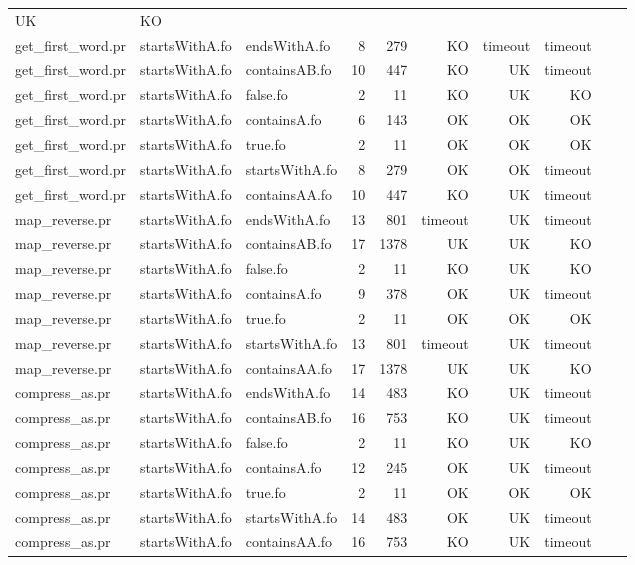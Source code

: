 \begin{tabular}{l|l|l|r|r|r|r|r|r|r}
UK & KO \\
get\_first\_word.pr & startsWithA.fo & endsWithA.fo & 8 & 279 & KO & 
timeout & timeout \\
get\_first\_word.pr & startsWithA.fo & containsAB.fo & 10 & 447 & KO & 
UK & timeout \\
get\_first\_word.pr & startsWithA.fo & false.fo & 2 & 11 & KO & 
UK & KO \\
get\_first\_word.pr & startsWithA.fo & containsA.fo & 6 & 143 & OK & 
OK & OK \\
get\_first\_word.pr & startsWithA.fo & true.fo & 2 & 11 & OK & 
OK & OK \\
get\_first\_word.pr & startsWithA.fo & startsWithA.fo & 8 & 279 & OK & 
OK & timeout \\
get\_first\_word.pr & startsWithA.fo & containsAA.fo & 10 & 447 & KO & 
UK & timeout \\
map\_reverse.pr & startsWithA.fo & endsWithA.fo & 13 & 801 & timeout & 
UK & timeout \\
map\_reverse.pr & startsWithA.fo & containsAB.fo & 17 & 1378 & UK & 
UK & KO \\
map\_reverse.pr & startsWithA.fo & false.fo & 2 & 11 & KO & 
UK & KO \\
map\_reverse.pr & startsWithA.fo & containsA.fo & 9 & 378 & OK & 
UK & timeout \\
map\_reverse.pr & startsWithA.fo & true.fo & 2 & 11 & OK & 
OK & OK \\
map\_reverse.pr & startsWithA.fo & startsWithA.fo & 13 & 801 & timeout & 
UK & timeout \\
map\_reverse.pr & startsWithA.fo & containsAA.fo & 17 & 1378 & UK & 
UK & KO \\
compress\_as.pr & startsWithA.fo & endsWithA.fo & 14 & 483 & KO & 
UK & timeout \\
compress\_as.pr & startsWithA.fo & containsAB.fo & 16 & 753 & KO & 
UK & timeout \\
compress\_as.pr & startsWithA.fo & false.fo & 2 & 11 & KO & 
UK & KO \\
compress\_as.pr & startsWithA.fo & containsA.fo & 12 & 245 & OK & 
UK & timeout \\
compress\_as.pr & startsWithA.fo & true.fo & 2 & 11 & OK & 
OK & OK \\
compress\_as.pr & startsWithA.fo & startsWithA.fo & 14 & 483 & OK & 
UK & timeout \\
compress\_as.pr & startsWithA.fo & containsAA.fo & 16 & 753 & KO & 
UK & timeout \\

\end{tabular}
